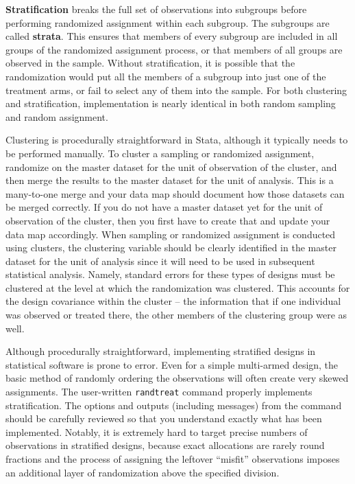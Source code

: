 \textbf{Stratification} breaks the full set of observations into subgroups
before performing randomized assignment within each subgroup.
The subgroups are called \textbf{strata}.
This ensures that members of every subgroup
are included in all groups of the randomized assignment process,
or that members of all groups are observed in the sample.
Without stratification, it is possible that the randomization
would put all the members of a subgroup into just one of the treatment arms,
or fail to select any of them into the sample.
For both clustering and stratification,
implementation is nearly identical in both random sampling and random assignment.

Clustering is procedurally straightforward in Stata,
although it typically needs to be performed manually.
To cluster a sampling or randomized assignment,
randomize on the master dataset for the unit of observation of the cluster,
and then merge the results to the master dataset for the unit of analysis.
This is a many-to-one merge and your data map should document
how those datasets can be merged correctly.
If you do not have a master dataset yet for the unit of observation of the cluster,
then you first have to create that and update your data map accordingly.
When sampling or randomized assignment is conducted using clusters,
the clustering variable should be clearly identified in the master dataset
for the unit of analysis
since it will need to be used in subsequent statistical analysis.
Namely, standard errors for these types of designs must be clustered
at the level at which the randomization was clustered.
This accounts for the design covariance within the cluster --
the information that if one individual was observed or treated there,
the other members of the clustering group were as well.

Although procedurally straightforward, 
implementing stratified designs in statistical software is prone to error.
Even for a simple multi-armed design,
the basic method of randomly ordering the observations
will often create very skewed assignments.
The user-written \texttt{randtreat} command properly implements stratification.
The options and outputs (including messages) from the command should be carefully reviewed
so that you understand exactly what has been implemented.
Notably, it is extremely hard to target precise numbers of observations
in stratified designs, because exact allocations are rarely round fractions
and the process of assigning the leftover ``misfit'' observations
imposes an additional layer of randomization above the specified division.

